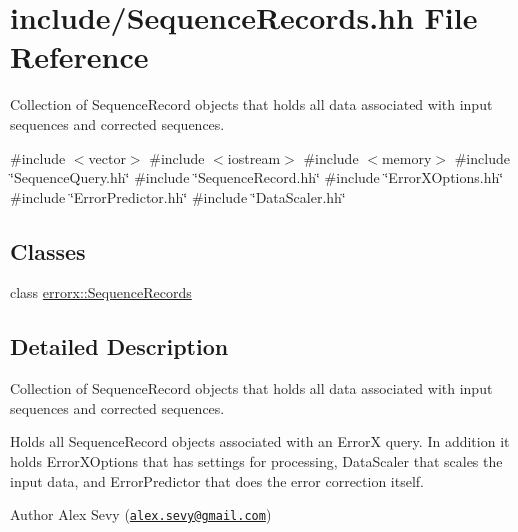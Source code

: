 \hypertarget{_sequence_records_8hh}{}\section{include/\+Sequence\+Records.hh File Reference}
\label{_sequence_records_8hh}


Collection of Sequence\+Record objects that holds all data associated with input sequences and corrected sequences.  


{\ttfamily \#include $<$vector$>$}\newline
{\ttfamily \#include $<$iostream$>$}\newline
{\ttfamily \#include $<$memory$>$}\newline
{\ttfamily \#include \char`\"{}Sequence\+Query.\+hh\char`\"{}}\newline
{\ttfamily \#include \char`\"{}Sequence\+Record.\+hh\char`\"{}}\newline
{\ttfamily \#include \char`\"{}Error\+X\+Options.\+hh\char`\"{}}\newline
{\ttfamily \#include \char`\"{}Error\+Predictor.\+hh\char`\"{}}\newline
{\ttfamily \#include \char`\"{}Data\+Scaler.\+hh\char`\"{}}\newline
\subsection*{Classes}
\begin{DoxyCompactItemize}
\item 
class \mbox{\hyperlink{classerrorx_1_1_sequence_records}{errorx\+::\+Sequence\+Records}}
\end{DoxyCompactItemize}


\subsection{Detailed Description}
Collection of Sequence\+Record objects that holds all data associated with input sequences and corrected sequences. 

Holds all Sequence\+Record objects associated with an ErrorX query. In addition it holds Error\+X\+Options that has settings for processing, Data\+Scaler that scales the input data, and Error\+Predictor that does the error correction itself. \begin{DoxyAuthor}{Author}
Alex Sevy (\href{mailto:alex.sevy@gmail.com}{\tt alex.\+sevy@gmail.\+com}) 
\end{DoxyAuthor}
